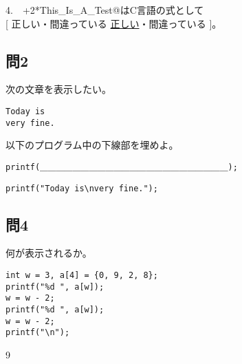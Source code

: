 \documentclass[a4j]{jarticle}
\def\ans#1#2{
\ifnum \anss=1
#1
\else
#2
\fi
}
\begin{document}
\begin{multicols*}{2}
4.　\verb@ax+2*This_Is_A_Test@はC言語の式として\\
\hfill[\ans{正しい・間違っている}{\underline{正しい}・間違っている}]。





\subsection*{問2}

次の文章を表示したい。
\begin{verbatim}
Today is
very fine.
\end{verbatim}

以下のプログラム中の下線部を埋めよ。

\ifnum {}
\begin{verbatim}
printf(＿＿＿＿＿＿＿＿＿＿＿＿＿＿＿＿＿＿＿＿＿＿＿);
\end{verbatim}
\else
\begin{verbatim}
printf("Today is\nvery fine.");
\end{verbatim}
\fi




\subsection*{問4}

何が表示されるか。
\begin{verbatim}
int w = 3, a[4] = {0, 9, 2, 8};
printf("%d ", a[w]);
w = w - 2;
printf("%d ", a[w]);
w = w - 2;
printf("\n");
\end{verbatim}

\ans{\mbox{}}{{ 9}}


%
%
%
%








\end{multicols*}
\end{document}
